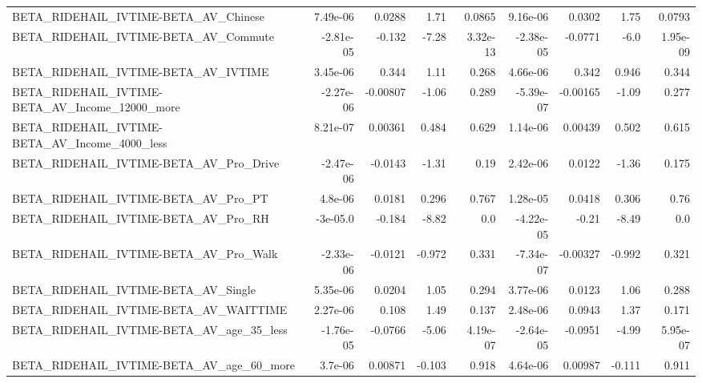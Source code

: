 \begin{tabular}{lrrrrrrrr}
BETA\_RIDEHAIL\_IVTIME-BETA\_AV\_Chinese               &    7.49e-06 &       0.0288 &      1.71 &   0.0865 &   9.16e-06 &      0.0302 &         1.75 &        0.0793 \\
BETA\_RIDEHAIL\_IVTIME-BETA\_AV\_Commute               &   -2.81e-05 &       -0.132 &     -7.28 & 3.32e-13 &  -2.38e-05 &     -0.0771 &         -6.0 &      1.95e-09 \\
BETA\_RIDEHAIL\_IVTIME-BETA\_AV\_IVTIME                &    3.45e-06 &        0.344 &      1.11 &    0.268 &   4.66e-06 &       0.342 &        0.946 &         0.344 \\
BETA\_RIDEHAIL\_IVTIME-BETA\_AV\_Income\_12000\_more     &   -2.27e-06 &     -0.00807 &     -1.06 &    0.289 &  -5.39e-07 &    -0.00165 &        -1.09 &         0.277 \\
BETA\_RIDEHAIL\_IVTIME-BETA\_AV\_Income\_4000\_less      &    8.21e-07 &      0.00361 &     0.484 &    0.629 &   1.14e-06 &     0.00439 &        0.502 &         0.615 \\
BETA\_RIDEHAIL\_IVTIME-BETA\_AV\_Pro\_Drive             &   -2.47e-06 &      -0.0143 &     -1.31 &     0.19 &   2.42e-06 &      0.0122 &        -1.36 &         0.175 \\
BETA\_RIDEHAIL\_IVTIME-BETA\_AV\_Pro\_PT                &     4.8e-06 &       0.0181 &     0.296 &    0.767 &   1.28e-05 &      0.0418 &        0.306 &          0.76 \\
BETA\_RIDEHAIL\_IVTIME-BETA\_AV\_Pro\_RH                &    -3e-05.0 &       -0.184 &     -8.82 &      0.0 &  -4.22e-05 &       -0.21 &        -8.49 &           0.0 \\
BETA\_RIDEHAIL\_IVTIME-BETA\_AV\_Pro\_Walk              &   -2.33e-06 &      -0.0121 &    -0.972 &    0.331 &  -7.34e-07 &    -0.00327 &       -0.992 &         0.321 \\
BETA\_RIDEHAIL\_IVTIME-BETA\_AV\_Single                &    5.35e-06 &       0.0204 &      1.05 &    0.294 &   3.77e-06 &      0.0123 &         1.06 &         0.288 \\
BETA\_RIDEHAIL\_IVTIME-BETA\_AV\_WAITTIME              &    2.27e-06 &        0.108 &      1.49 &    0.137 &   2.48e-06 &      0.0943 &         1.37 &         0.171 \\
BETA\_RIDEHAIL\_IVTIME-BETA\_AV\_age\_35\_less           &   -1.76e-05 &      -0.0766 &     -5.06 & 4.19e-07 &  -2.64e-05 &     -0.0951 &        -4.99 &      5.95e-07 \\
BETA\_RIDEHAIL\_IVTIME-BETA\_AV\_age\_60\_more           &     3.7e-06 &      0.00871 &    -0.103 &    0.918 &   4.64e-06 &     0.00987 &       -0.111 &         0.911 \\

\end{tabular}
